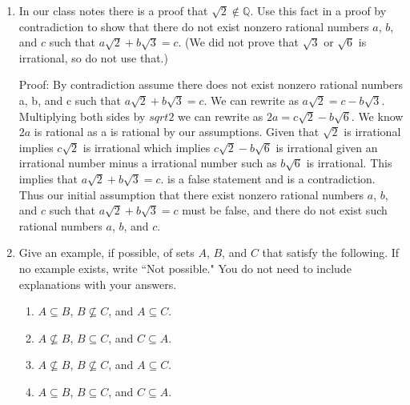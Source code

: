 \documentclass{article}
\newcommand{\bR}{\mathbb{R}}
\newcommand{\bQ}{\mathbb{Q}}
\begin{document}
{\begin{enumerate}[labelindent=0pt,leftmargin=0pt]
\begin{enumerate}
Lemma: For all $n\in\bR$ if $n \neq 0$ there there exists $a,k\in\bR$ such that $a\geq 0$, k is odd, and $n=x^a k$. 

Proof: Assume $\sqrt{x}$ is rational. 
Then there exist $m,n\in\bR$ with $n \neq 0$ such that $\sqrt{x} = m/n$
By the lemma, $m=x^a j$ and $n=2^b k$ for some $a,b,j,k\in\bR$ with $a,b\geq0$, and  j and k are odd.
Since $\sqrt{x} = m/n$ we have $x = (x^a j / x^b k)^2 = x^2a j^2 / x^2b k^2$,
which in turn shows that $x^(2b+1) k^2 = x^2a j^2$ Since 


\item Contrapose the implications in your proof from part (a) and
reverse their order to give a direct proof of the proposition. (Which
version of the proof is cleaner? (That is rhetorical.))




\end{enumerate}
\item In our class notes there is a proof that $\sqrt{2}\not\in\bQ$.
Use this fact in a proof by contradiction to show that there do not exist
nonzero rational numbers $a$, $b$, and $c$ such that
$a\sqrt{2}+b\sqrt{3}=c$. (We did not prove that $\sqrt{3}$ or $\sqrt{6}$
is irrational, so do not use that.)


Proof: By contradiction assume there does not exist nonzero rational numbers a, b, and c such that $a\sqrt{2} + b\sqrt{3} = c$.
We can rewrite as $a\sqrt{2} =c - b\sqrt{3}$.
Multiplying both sides by $sqrt{2}$ we can rewrite as 
$2a =c\sqrt{2} - b\sqrt{6}$.
We know$2a$ is rational as a is rational by our assumptions. 
Given that $\sqrt{2}$ is irrational implies $c\sqrt{2}$ is irrational which implies 
$c\sqrt{2} - b\sqrt{6}$ is irrational given an irrational number minus a irrational number such as $b\sqrt{6}$ is irrational. 
This implies that $a\sqrt{2} + b\sqrt{3} = c$. is a false statement and is a contradiction. 
Thus our initial assumption that there exist nonzero rational numbers $a$, $b$, and $c$ such that $a\sqrt{2} + b\sqrt{3} = c$ must be false, and there do not exist such rational numbers $a$, $b$, and $c$.







\item Give an example, if possible, of sets $A$, $B$, and $C$ that
satisfy the following. If no example exists, write ``Not possible." You do
not need to include explanations with your answers.
\begin{enumerate}
\item $A\subseteq B$, $B\not\subseteq C$, and $A\subseteq C$.
\item $A\not\subseteq B$, $B\subseteq C$, and $C\subseteq A$.
\item $A\not\subseteq B$, $B\not\subseteq C$, and $A\subseteq C$.
\item $A\subseteq B$, $B\subseteq C$, and $C\subseteq A$.
\end{enumerate}
\end{enumerate}
}
\end{document}
